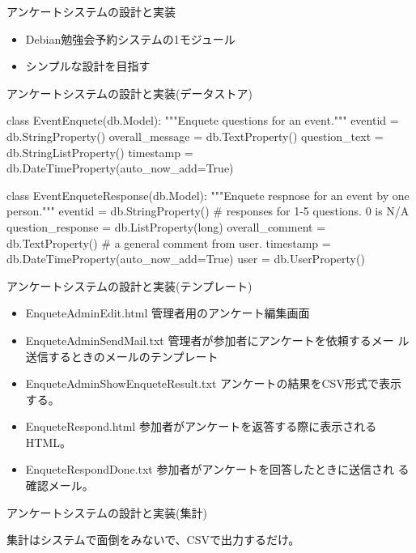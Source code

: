 \begin{frame}{アンケートシステムの設計と実装}
 \begin{itemize}
  \item Debian勉強会予約システムの1モジュール
  \item シンプルな設計を目指す
 \end{itemize}
\end{frame}

\begin{frame}[containsverbatim]{アンケートシステムの設計と実装(データストア)}
\begin{commandline}
class EventEnquete(db.Model):
    """Enquete questions for an event."""
    eventid = db.StringProperty()
    overall_message = db.TextProperty()
    question_text = db.StringListProperty()
    timestamp = db.DateTimeProperty(auto_now_add=True)

class EventEnqueteResponse(db.Model):
    """Enquete respnose for an event by one person."""
    eventid = db.StringProperty()
    # responses for 1-5 questions. 0 is N/A
    question_response = db.ListProperty(long)
    overall_comment = db.TextProperty() # a general comment from user.
    timestamp = db.DateTimeProperty(auto_now_add=True)
    user = db.UserProperty()
\end{commandline}

\end{frame}

\begin{frame}{アンケートシステムの設計と実装(テンプレート)}
 \begin{itemize}
 \item EnqueteAdminEdit.html 管理者用のアンケート編集画面
 \item EnqueteAdminSendMail.txt 管理者が参加者にアンケートを依頼するメー
       ル送信するときのメールのテンプレート
 \item EnqueteAdminShowEnqueteResult.txt アンケートの結果をCSV形式で表示
       する。
 \item EnqueteRespond.html 参加者がアンケートを返答する際に表示される
       HTML。
 \item EnqueteRespondDone.txt 参加者がアンケートを回答したときに送信され
       る確認メール。
\end{itemize}
\end{frame}

\begin{frame}{アンケートシステムの設計と実装(集計)}
 
 集計はシステムで面倒をみないで、CSVで出力するだけ。

\end{frame}

